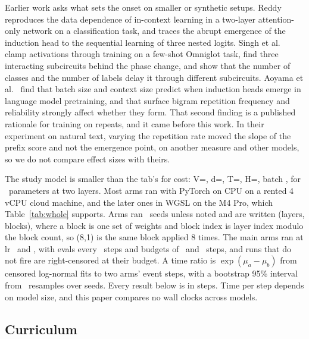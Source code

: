 \documentclass[10pt]{article}
\newcommand{\arm}[2]{(#1,#2)}
\begin{document}
Earlier work asks what sets the onset on smaller or synthetic setups. Reddy~\cite{reddy} reproduces the data dependence of in-context learning in a two-layer attention-only network on a classification task, and traces the abrupt emergence of the induction head to the sequential learning of three nested logits. Singh et al.~\cite{singh} clamp activations through training on a few-shot Omniglot task, find three interacting subcircuits behind the phase change, and show that the number of classes and the number of labels delay it through different subcircuits. Aoyama et al.~\cite{aoyama} find that batch size and context size predict when induction heads emerge in language model pretraining, and that surface bigram repetition frequency and reliability strongly affect whether they form. That second finding is a published rationale for training on repeats, and it came before this work. In their experiment on natural text, varying the repetition rate moved the slope of the prefix score and not the emergence point, on another measure and other models, so we do not compare effect sizes with theirs.

The study model is smaller than the tab's for cost: V=\nStudyV, d=\nStudyD, T=\nStudyT, H=\nStudyH, batch \nStudyB, for \nStudyParams\ parameters at two layers. Most arms ran with PyTorch on CPU on a rented 4 vCPU cloud machine, and the later ones in WGSL on the M4 Pro, which Table~\ref{tab:whole} supports. Arms ran \nNTwoTwoHi\ seeds unless noted and are written (layers, blocks), where a block is one set of weights and block index is layer index modulo the block count, so \arm{8}{1} is the same block applied 8 times. The main arms ran at lr \nLrHi\ and \nLrLo, with evals every \nEvalEvery\ steps and budgets of \nBudgetTwoTwoHi\ and \nBudgetTwoTwoLo\ steps, and runs that do not fire are right-censored at their budget. A time ratio is $\exp(\mu_a - \mu_b)$ from censored log-normal fits to two arms' event steps, with a bootstrap 95\% interval from \nBootResamples\ resamples over seeds. Every result below is in steps. Time per step depends on model size, and this paper compares no wall clocks across models.

\subsection{Curriculum}
\end{document}
